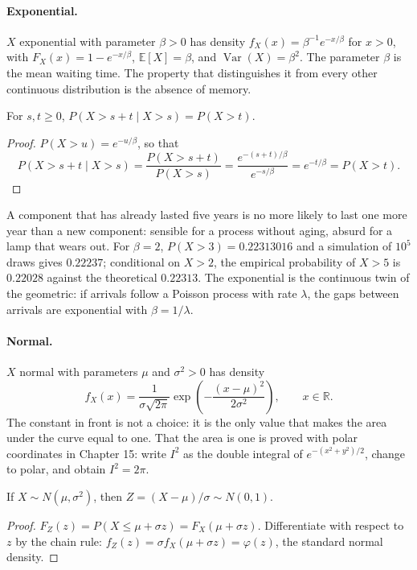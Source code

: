 \paragraph{Exponential.} $X$ exponential with parameter $\beta>0$ has
density $f_X(x)=\beta^{-1}e^{-x/\beta}$ for $x>0$, with
$F_X(x)=1-e^{-x/\beta}$, $\mathbb{E}[X]=\beta$, and $\operatorname{Var}(X)=\beta^2$.
The parameter $\beta$ is the mean waiting time. The property that distinguishes it from every
other continuous distribution is the absence of memory.

\begin{proposisi}[Memoryless]
For $s,t\ge0$, $P(X>s+t\mid X>s)=P(X>t)$.
\end{proposisi}

\begin{proof}
$P(X>u)=e^{-u/\beta}$, so that
\[
P(X>s+t\mid X>s)=\frac{P(X>s+t)}{P(X>s)}
=\frac{e^{-(s+t)/\beta}}{e^{-s/\beta}}=e^{-t/\beta}=P(X>t).
\]
\end{proof}

A component that has already lasted five years is no more likely to last one more year
than a new component: sensible for a process without aging, absurd for a lamp that wears out.
For $\beta=2$, $P(X>3)=0.22313016$ and a simulation of $10^5$ draws
gives $0.22237$;
conditional on $X>2$, the empirical probability of $X>5$ is $0.22028$ against the theoretical
$0.22313$. The exponential is the continuous twin of the geometric: if arrivals follow a
Poisson process with rate $\lambda$, the gaps between arrivals are exponential with
$\beta=1/\lambda$.

\paragraph{Normal.} $X$ normal with parameters $\mu$ and $\sigma^2>0$ has
density
\[
f_X(x)=\frac{1}{\sigma\sqrt{2\pi}}
\exp\!\left(-\frac{(x-\mu)^2}{2\sigma^2}\right),\qquad x\in\mathbb{R}.
\]
The constant in front is not a choice: it is the only value that makes the area under the
curve equal to one. That the area is one is proved with polar coordinates in Chapter 15:
write $I^2$ as the double integral of $e^{-(x^2+y^2)/2}$, change to polar, and obtain
$I^2=2\pi$.

\begin{proposisi}
If $X\sim N(\mu,\sigma^2)$, then $Z=(X-\mu)/\sigma\sim N(0,1)$.
\end{proposisi}

\begin{proof}
$F_Z(z)=P(X\le\mu+\sigma z)=F_X(\mu+\sigma z)$. Differentiate with respect to $z$ by the chain
rule: $f_Z(z)=\sigma f_X(\mu+\sigma z)=\varphi(z)$, the standard normal density.
\end{proof}

